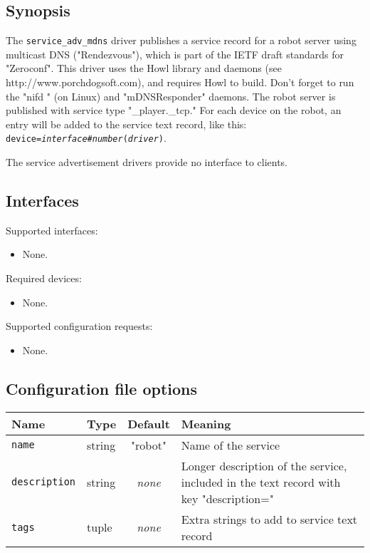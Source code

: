 
\subsection*{Synopsis}
 The {\tt service\_adv\_mdns} driver publishes a service record for a robot 
server using multicast DNS ("Rendezvous"), which is part of the IETF draft
standards for "Zeroconf". This driver uses the Howl library and daemons 
(see http://www.porchdogsoft.com), and requires Howl to build.  Don't forget to
run the "nifd " (on Linux) and "mDNSResponder" daemons.  The robot server is published with service
type "\_player.\_tcp." For each device on the robot, an entry will
be added to the service text record, like this: 
{\tt device={\it interface}\#{\it number}({\it driver})}. 
 
The service advertisement drivers provide no interface to clients. 

\subsection*{Interfaces}

\noindent Supported interfaces:
\begin{itemize}
\item None.
\end{itemize}

\noindent Required devices:
\begin{itemize}
\item None.
\end{itemize}

\noindent Supported configuration requests:
\begin{itemize}
\item None.
\end{itemize}

\subsection*{Configuration file options}

\begin{center}
{\small \begin{tabularx}{\columnwidth}{|l|l|c|X|}
\hline
Name & Type & Default & Meaning\\
\hline
{\tt name} & string & "robot" & Name of the service\\
{\tt description} & string & {\it none} & Longer description of the service,
included in the text record with key "description="\\
{\tt tags} & tuple & {\it none} & Extra strings to add to service text record \\
\hline
\end{tabularx}}
\end{center}


